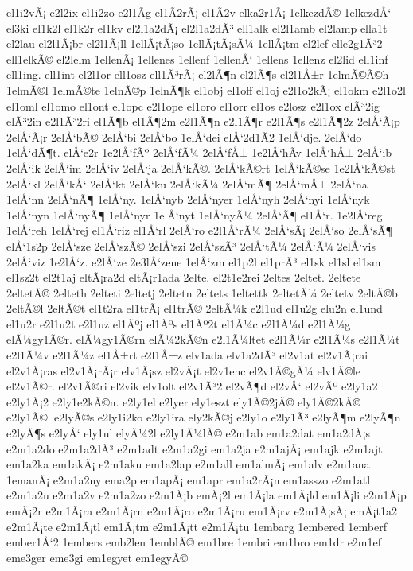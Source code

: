 {el1i2vÃ¡
e2l2ix
el1i2zo
e2l1Ã­g
el1Ã­2rÃ¡
el1Ã­2v
elka2r1Ã¡
1elkezdÃ©
1elkezdÅ‘
el3ki
el1k2l
el1k2r
el1kv
el2l1a2dÃ¡
el2l1a2dÃ³
ell1alk
el2l1amb
el2lamp
ella1t
el2lau
el2l1Ã¡br
el2l1Ã¡ll
1ellÃ¡tÃ¡so
1ellÃ¡tÃ¡sÃ¼
1ellÃ¡tm
el2lef
elle2g1Ã³2
ell1elkÃ©
el2lelm
1ellenÃ¡
1ellenes
1ellenf
1ellenÅ‘
1ellens
1ellenz
el2lid
ell1inf
ell1ing.
ell1int
el2l1or
ell1osz
ell1Ã³rÃ¡
el2lÃ¶n
el2lÃ¶s
el2l1Å±r
1elmÃ©Ã©h
1elmÃ©l
1elmÃ©te
1elnÃ©p
1elnÃ¶k
el1obj
el1off
el1oj
e2l1o2kÃ¡
el1okm
e2l1o2l
el1oml
el1omo
el1ont
el1opc
e2l1ope
el1oro
el1orr
el1os
e2losz
e2l1ox
elÃ³2ig
elÃ³2in
e2l1Ã³2ri
el1Ã¶b
el1Ã¶2m
e2l1Ã¶n
e2l1Ã¶r
e2l1Ã¶s
e2l1Ã¶2z
2elÅ‘Ã¡p
2elÅ‘Ã¡r
2elÅ‘bÃ©
2elÅ‘bi
2elÅ‘bo
1elÅ‘dei
elÅ‘2d1Ã­2
1elÅ‘dje.
2elÅ‘do
1elÅ‘dÃ¶t.
elÅ‘e2r
1e2lÅ‘fÃº
2elÅ‘fÃ¼
2elÅ‘fÅ±
1e2lÅ‘hÃ­v
1elÅ‘hÅ±
2elÅ‘ib
2elÅ‘ik
2elÅ‘im
2elÅ‘iv
2elÅ‘ja
2elÅ‘kÃ©.
2elÅ‘kÃ©rt
1elÅ‘kÃ©se
1e2lÅ‘kÃ©st
2elÅ‘kl
2elÅ‘kÅ‘
2elÅ‘kt
2elÅ‘ku
2elÅ‘kÃ¼
2elÅ‘mÃ¶
2elÅ‘mÅ±
2elÅ‘na
1elÅ‘nn
2elÅ‘nÃ¶
1elÅ‘ny.
1elÅ‘nyb
2elÅ‘nyer
1elÅ‘nyh
2elÅ‘nyi
1elÅ‘nyk
1elÅ‘nyn
1elÅ‘nyÃ¶
1elÅ‘nyr
1elÅ‘nyt
1elÅ‘nyÃ¼
2elÅ‘Ã¶
el1Å‘r.
1e2lÅ‘reg
1elÅ‘reh
1elÅ‘rej
el1Å‘riz
el1Å‘rl
2elÅ‘ro
e2l1Å‘rÃ¼
2elÅ‘sÃ¡
2elÅ‘so
2elÅ‘sÃ¶
elÅ‘1s2p
2elÅ‘sze
2elÅ‘szÃ©
2elÅ‘szi
2elÅ‘szÃ³
2elÅ‘tÃ¼
2elÅ‘Ã¼
2elÅ‘vis
2elÅ‘viz
1e2lÅ‘z.
e2lÅ‘ze
2e3lÅ‘zene
1elÅ‘zm
el1p2l
el1prÃ³
el1sk
el1sl
el1sm
el1sz2t
el2t1aj
eltÃ¡ra2d
eltÃ¡r1ada
2elte.
el2t1e2rei
2eltes
2eltet.
2eltete
2eltetÃ©
2elteth
2elteti
2eltetj
2eltetn
2eltets
1eltettk
2eltetÃ¼
2eltetv
2eltÃ©b
2eltÃ©l
2eltÃ©t
el1t2ra
el1trÃ¡
el1trÃ©
2eltÃ¼k
e2l1ud
el1u2g
elu2n
el1und
el1u2r
e2l1u2t
e2l1uz
el1Ãºj
el1Ãºs
el1Ãº2t
el1Ã¼c
e2l1Ã¼d
e2l1Ã¼g
elÃ¼gy1Ã©r.
elÃ¼gy1Ã©rn
elÃ¼2kÃ©n
e2l1Ã¼ltet
e2l1Ã¼r
e2l1Ã¼s
e2l1Ã¼t
e2l1Ã¼v
e2l1Ã¼z
el1Å±rt
e2l1Å±z
elv1ada
elv1a2dÃ³
el2v1at
el2v1Ã¡rai
el2v1Ã¡ras
el2v1Ã¡rÃ¡r
elv1Ã¡sz
el2vÃ¡t
el2v1enc
el2v1Ã©gÃ¼
elv1Ã©le
el2v1Ã©r.
el2v1Ã©ri
el2vik
elv1olt
el2v1Ã³2
el2vÃ¶d
el2vÅ‘
el2vÃº
e2ly1a2
e2ly1Ã¡2
e2ly1e2kÃ©n.
e2ly1el
e2lyer
ely1eszt
ely1Ã©2jÃ©
ely1Ã©2kÃ©
e2ly1Ã©l
e2lyÃ©s
e2ly1i2ko
e2ly1ira
ely2kÃ©j
e2ly1o
e2ly1Ã³
e2lyÃ¶m
e2lyÃ¶n
e2lyÃ¶s
e2lyÅ‘
ely1ul
elyÃ¼2l
e2ly1Ã¼lÃ©
e2m1ab
em1a2dat
em1a2dÃ¡s
e2m1a2do
e2m1a2dÃ³
e2m1adt
e2m1a2gi
em1a2ja
e2m1ajÃ¡
em1ajk
e2m1ajt
em1a2ka
em1akÃ¡
e2m1aku
em1a2lap
e2m1all
em1almÃ¡
em1alv
e2m1ana
1emanÃ¡
e2m1a2ny
ema2p
em1apÃ¡
em1apr
em1a2rÃ¡n
em1asszo
e2m1atl
e2m1a2u
e2m1a2v
e2m1a2zo
e2m1Ã¡b
emÃ¡2l
em1Ã¡la
em1Ã¡ld
em1Ã¡li
e2m1Ã¡p
emÃ¡2r
e2m1Ã¡ra
e2m1Ã¡rn
e2m1Ã¡ro
e2m1Ã¡ru
em1Ã¡rv
e2m1Ã¡sÃ¡
emÃ¡t1a2
e2m1Ã¡te
e2m1Ã¡tl
em1Ã¡tm
e2m1Ã¡tt
e2m1Ã¡tu
1embarg
1embered
1emberf
ember1Å‘2
1embers
emb2len
1emblÃ©
em1bre
1embri
em1bro
em1dr
e2m1ef
eme3ger
eme3gi
em1egyet
em1egyÃ©
}
